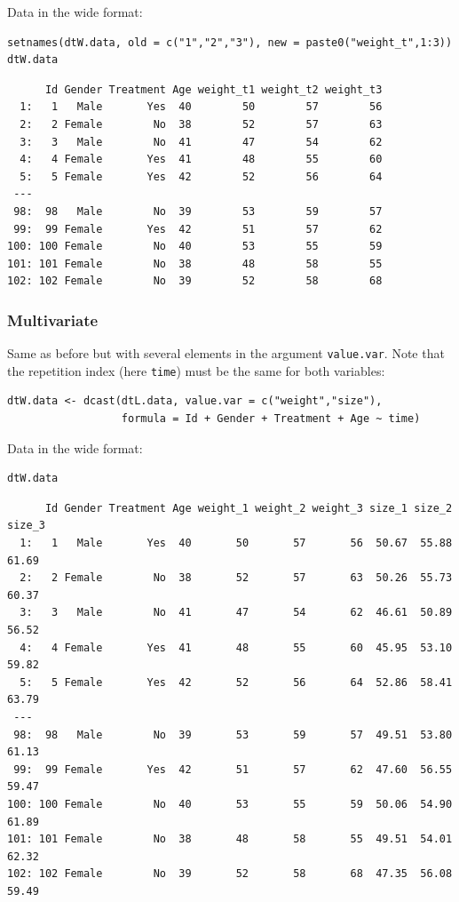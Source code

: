 \documentclass{article}
\begin{document}
Data in the wide format:
\lstset{language=r,label= ,caption= ,captionpos=b,numbers=none}
\begin{lstlisting}
setnames(dtW.data, old = c("1","2","3"), new = paste0("weight_t",1:3))
dtW.data
\end{lstlisting}

\begin{verbatim}
      Id Gender Treatment Age weight_t1 weight_t2 weight_t3
  1:   1   Male       Yes  40        50        57        56
  2:   2 Female        No  38        52        57        63
  3:   3   Male        No  41        47        54        62
  4:   4 Female       Yes  41        48        55        60
  5:   5 Female       Yes  42        52        56        64
 ---                                                       
 98:  98   Male        No  39        53        59        57
 99:  99 Female       Yes  42        51        57        62
100: 100 Female        No  40        53        55        59
101: 101 Female        No  38        48        58        55
102: 102 Female        No  39        52        58        68
\end{verbatim}

\clearpage

\subsubsection{Multivariate}
\label{sec:org0659fdb}


Same as before but with several elements in the argument
\texttt{value.var}. Note that the repetition index (here \texttt{time}) must be the
same for both variables:
\lstset{language=r,label= ,caption= ,captionpos=b,numbers=none}
\begin{lstlisting}
dtW.data <- dcast(dtL.data, value.var = c("weight","size"),
				  formula = Id + Gender + Treatment + Age ~ time)
\end{lstlisting}

Data in the wide format:
\lstset{language=r,label= ,caption= ,captionpos=b,numbers=none}
\begin{lstlisting}
dtW.data
\end{lstlisting}

\begin{verbatim}
      Id Gender Treatment Age weight_1 weight_2 weight_3 size_1 size_2 size_3
  1:   1   Male       Yes  40       50       57       56  50.67  55.88  61.69
  2:   2 Female        No  38       52       57       63  50.26  55.73  60.37
  3:   3   Male        No  41       47       54       62  46.61  50.89  56.52
  4:   4 Female       Yes  41       48       55       60  45.95  53.10  59.82
  5:   5 Female       Yes  42       52       56       64  52.86  58.41  63.79
 ---                                                                         
 98:  98   Male        No  39       53       59       57  49.51  53.80  61.13
 99:  99 Female       Yes  42       51       57       62  47.60  56.55  59.47
100: 100 Female        No  40       53       55       59  50.06  54.90  61.89
101: 101 Female        No  38       48       58       55  49.51  54.01  62.32
102: 102 Female        No  39       52       58       68  47.35  56.08  59.49
\end{verbatim}
\end{document}
